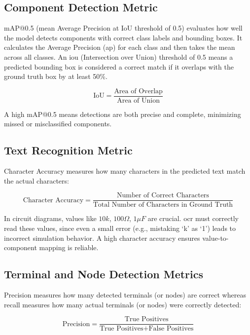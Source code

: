\subsection{Component Detection Metric}

mAP@0.5 (mean Average Precision at IoU threshold of 0.5) evaluates how well the model detects components with correct class labels and bounding boxes. It calculates the Average Precision (\gls{ap}) for each class and then takes the mean across all classes. An \gls{iou} (Intersection over Union) threshold of 0.5 means a predicted bounding box is considered a correct match if it overlaps with the ground truth box by at least 50\%.

\begin{equation}
\text{IoU} = \frac{\text{Area of Overlap}}{\text{Area of Union}}
\label{eq:iou-metric}
\end{equation}

A high mAP@0.5 means detections are both precise and complete, minimizing missed or misclassified components.

\subsection{Text Recognition Metric}

Character Accuracy measures how many characters in the predicted text match the actual characters:

\begin{equation}
\text{Character Accuracy} = \frac{\text{Number of Correct Characters}}{\text{Total Number of Characters in Ground Truth}}
\label{eq:character-accuracy}
\end{equation}

In circuit diagrams, values like $10k$, $100\Omega$, $1\mu F$ are crucial. \gls{ocr} must correctly read these values, since even a small error (e.g., mistaking `k' as `1') leads to incorrect simulation behavior. A high character accuracy ensures value-to-component mapping is reliable.

\subsection{Terminal and Node Detection Metrics}

Precision measures how many detected terminals (or nodes) are correct whereas recall measures how many actual terminals (or nodes) were correctly detected:

\begin{equation}
\text{Precision} = \frac{\text{True Positives}}{\text{True Positives} + \text{False Positives}}
\label{eq:precision}
\end{equation}

